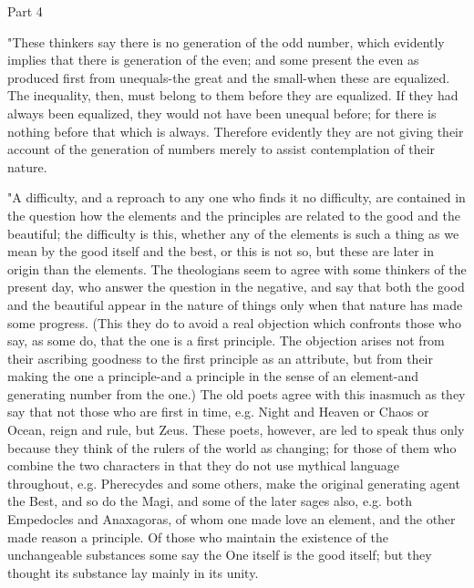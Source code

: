 Part 4 

"These thinkers say there is no generation of the odd number, which
evidently implies that there is generation of the even; and some present
the even as produced first from unequals-the great and the small-when
these are equalized. The inequality, then, must belong to them before
they are equalized. If they had always been equalized, they would
not have been unequal before; for there is nothing before that which
is always. Therefore evidently they are not giving their account of
the generation of numbers merely to assist contemplation of their
nature. 

"A difficulty, and a reproach to any one who finds it no difficulty,
are contained in the question how the elements and the principles
are related to the good and the beautiful; the difficulty is this,
whether any of the elements is such a thing as we mean by the good
itself and the best, or this is not so, but these are later in origin
than the elements. The theologians seem to agree with some thinkers
of the present day, who answer the question in the negative, and say
that both the good and the beautiful appear in the nature of things
only when that nature has made some progress. (This they do to avoid
a real objection which confronts those who say, as some do, that the
one is a first principle. The objection arises not from their ascribing
goodness to the first principle as an attribute, but from their making
the one a principle-and a principle in the sense of an element-and
generating number from the one.) The old poets agree with this inasmuch
as they say that not those who are first in time, e.g. Night and Heaven
or Chaos or Ocean, reign and rule, but Zeus. These poets, however,
are led to speak thus only because they think of the rulers of the
world as changing; for those of them who combine the two characters
in that they do not use mythical language throughout, e.g. Pherecydes
and some others, make the original generating agent the Best, and
so do the Magi, and some of the later sages also, e.g. both Empedocles
and Anaxagoras, of whom one made love an element, and the other made
reason a principle. Of those who maintain the existence of the unchangeable
substances some say the One itself is the good itself; but they thought
its substance lay mainly in its unity. 

